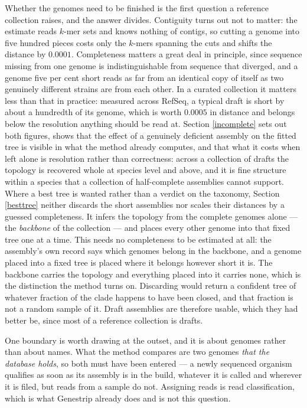 \documentclass[pdflatex,sn-vancouver-num]{sn-jnl}
\begin{document}
Whether the genomes need to be finished is the first question a reference collection raises, and the
answer divides. Contiguity turns out not to matter: the estimate reads $k$-mer sets and knows nothing
of contigs, so cutting a genome into five hundred pieces costs only the $k$-mers spanning the cuts and
shifts the distance by $0.0001$. Completeness matters a great deal in principle, since sequence missing from one
genome is indistinguishable from sequence that diverged, and a genome five per cent short reads as far
from an identical copy of itself as two genuinely different strains are from each other. In a curated
collection it matters less than that in practice: measured across RefSeq, a typical draft is short by
about a hundredth of its genome, which is worth $0.0005$ in distance and belongs below the resolution
anything should be read at. Section \ref{incomplete} sets out both figures, shows that the effect of a
genuinely deficient assembly on the fitted tree is visible in what the method already computes, and
that what it costs when left alone is resolution rather than correctness: across a collection of
drafts the topology is recovered whole at species level and above, and it is fine structure within a
species that a collection of half-complete assemblies cannot support. Where a best tree is wanted
rather than a verdict on the taxonomy, Section \ref{besttree} neither discards the short assemblies
nor scales their distances by a guessed completeness. It infers the topology from the complete genomes
alone --- the \emph{backbone} of the collection --- and places every other genome into that fixed tree
one at a time. This needs no completeness to be estimated at all: the assembly's own record says which
genomes belong in the backbone, and a genome placed into a fixed tree is placed where it belongs
however short it is. The backbone carries the topology and everything placed into it carries none,
which is the distinction the method turns on. Discarding would return a confident tree of
whatever fraction of the clade happens to have been closed, and that fraction is not a random sample
of it. Draft assemblies are therefore usable, which they had better be, since most of a reference
collection is drafts.

One boundary is worth drawing at the outset, and it is about genomes rather than about names. What
the method compares are two genomes \emph{that the database holds}, so both must have been entered ---
a newly sequenced organism qualifies as soon as its assembly is in the build, whatever it is called
and wherever it is filed, but reads from a sample do not. Assigning reads is read classification,
which is what Genestrip already does and is not this question.
\end{document}
